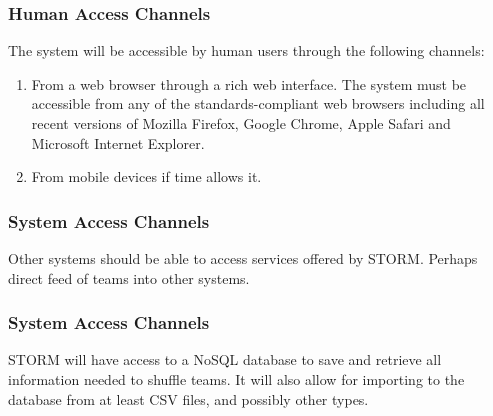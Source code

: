 \subsubsection{Human Access Channels}
The system will be accessible by human users through the following channels:\par
\begin{enumerate}
\item From a web browser through a rich web interface. The system must be accessible from any of the standards-compliant web browsers including all recent versions of Mozilla Firefox, Google Chrome, Apple Safari and Microsoft Internet Explorer.
\item From mobile devices if time allows it.
\end{enumerate}
\subsubsection{System Access Channels}
Other systems should be able to access services offered by STORM. Perhaps direct feed of teams into other systems.
\subsubsection{System Access Channels}
STORM will have access to a NoSQL database to save and retrieve all information needed to shuffle teams. It will also allow for importing to the database from at least CSV files, and possibly other types.